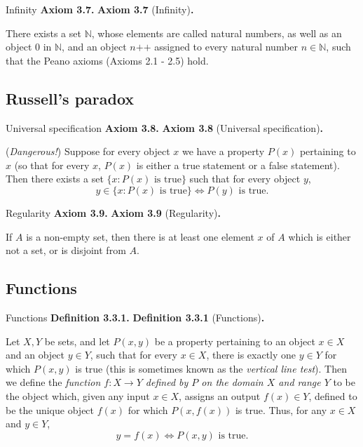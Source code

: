 \documentclass[12pt]{article}
\newcommand{\succr}[1]{#1 \textrm{++}}
\newenvironment{df}[2][\relax]{
\vspace{4mm}
    \noindent\setlength{\parskip}{1em}%
    \ifx#1\relax%
        \textbf{#2. }%
    \else%
        \textbf{#2} (#1)\textbf{. }%
    \fi%
    \ignorespaces%
}{}
\theoremstyle{remark}
\begin{document}
\begin{df}[Infinity]{Axiom 3.7}
    There exists a set $\mathbb{N}$, whose elements are called natural numbers, as well as an object $0$ in $\mathbb{N}$, and an object $\succr{n}$ assigned to every natural number $n \in \mathbb{N}$, such that the Peano axioms (Axioms 2.1 - 2.5) hold.
\end{df}


\subsection{Russell's paradox}
\begin{df}[Universal specification]{Axiom 3.8}
    (\textit{Dangerous!})
    Suppose for every object $x$ we have a property $P(x)$ pertaining to $x$ (so that for every $x$, $P(x)$ is either a true statement or a false statement).
    Then there exists a set $\{x : P(x) \text{ is true} \}$ such that for every object $y$,
    {\setlength{\belowdisplayskip}{-10pt} \setlength{\belowdisplayshortskip}{-10pt}
    \[
        y \in \{x : P(x) \text{ is true} \} \iff P(y) \text{ is true.}
    \]
    }
\end{df}


\begin{df}[Regularity]{Axiom 3.9}
    If $A$ is a non-empty set, then there is at least one element $x$ of $A$ which is either not a set, or is disjoint from $A$.
\end{df}


\subsection{Functions}
\begin{df}[Functions]{Definition 3.3.1}
     Let $X, Y$ be sets, and let $P(x, y)$ be a property pertaining to an object $x \in X$ and an object $y \in Y$, such that for every $x \in X$, there is exactly one $y \in Y$ for which $P(x, y)$ is true (this is sometimes known as the \emph{vertical line test}).
     Then we define the \emph{function $f : X \to Y$ defined by $P$ on the domain $X$ and range $Y$} to be the object which, given any input $x \in X$, assigns an output $f(x) \in Y$, defined to be the unique object $f(x)$ for which $P(x, f(x))$ is true.
     Thus, for any $x \in X$ and $y \in Y$,
     {\setlength{\belowdisplayskip}{-10pt} \setlength{\belowdisplayshortskip}{-10pt}
     \[
        y = f(x) \iff P(x, y) \text{ is true.}
    \]
    }
\end{df}
\end{document}
